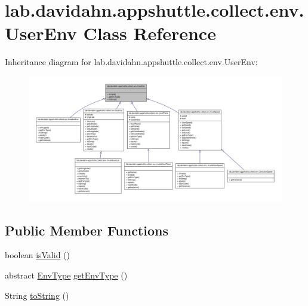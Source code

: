 \hypertarget{classlab_1_1davidahn_1_1appshuttle_1_1collect_1_1env_1_1_user_env}{\section{lab.\-davidahn.\-appshuttle.\-collect.\-env.\-User\-Env \-Class \-Reference}
\label{classlab_1_1davidahn_1_1appshuttle_1_1collect_1_1env_1_1_user_env}
}


\-Inheritance diagram for lab.\-davidahn.\-appshuttle.\-collect.\-env.\-User\-Env\-:
\nopagebreak
\begin{figure}[H]
\begin{center}
\leavevmode
\includegraphics[width=350pt]{classlab_1_1davidahn_1_1appshuttle_1_1collect_1_1env_1_1_user_env__inherit__graph}
\end{center}
\end{figure}
\subsection*{\-Public \-Member \-Functions}
\begin{DoxyCompactItemize}
\item 
boolean \hyperlink{classlab_1_1davidahn_1_1appshuttle_1_1collect_1_1env_1_1_user_env_afcea1d24283d8c862ad4740be2be7038}{is\-Valid} ()
\item 
abstract \hyperlink{enumlab_1_1davidahn_1_1appshuttle_1_1collect_1_1env_1_1_env_type}{\-Env\-Type} \hyperlink{classlab_1_1davidahn_1_1appshuttle_1_1collect_1_1env_1_1_user_env_ae83478f565a40e3650be12e7ed98e4cb}{get\-Env\-Type} ()
\item 
\-String \hyperlink{classlab_1_1davidahn_1_1appshuttle_1_1collect_1_1env_1_1_user_env_aa6f13b1e505775ee853a4acb372da083}{to\-String} ()
\end{DoxyCompactItemize}


